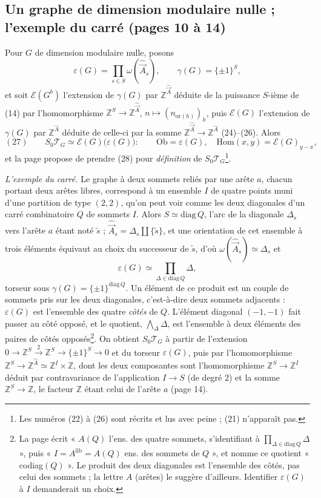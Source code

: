 \documentclass[11pt,a4paper]{article}
\begin{document}
\subsection*{Un graphe de dimension modulaire nulle ; l'exemple du carré
(pages 10 à 14)}

Pour $G$ de dimension modulaire nulle, posons
\[
\varepsilon(G) = \prod_{s \in S} \omega(\hat{\vec A}_s), \qquad
\gamma(G) = \{\pm 1\}^S,
\]
et soit $\mathcal{E}(G^b)$ l'extension de $\gamma(G)$ par $\mathbb{Z}^{\hat{\vec
A}}$ déduite de la puissance $S$-ième de (14) par l'homomorphisme
$\mathbb{Z}^S \to \mathbb{Z}^{\hat{\vec A}}$, $n \mapsto (n_{\mathrm{or}(h)})_h$,
puis $\mathcal{E}(G)$ l'extension de $\gamma(G)$ par $\mathbb{Z}^{\hat A}$
déduite de celle-ci par la somme $\mathbb{Z}^{\hat{\vec A}} \to
\mathbb{Z}^{\hat A}$ (24)--(26). Alors
\[
(27)\qquad S_0\mathcal{T}_G \simeq \mathcal{E}(G)\bigl(\varepsilon(G)\bigr) :
\qquad \mathrm{Ob} = \varepsilon(G), \quad \mathrm{Hom}(x,y) =
\mathcal{E}(G)_{y-x},
\]
et la page propose de prendre (28) pour \emph{définition} de
$S_0\mathcal{T}_G$\footnote{Les numéros (22) à (26) sont récrits et lus avec
peine ; (21) n'apparaît pas.}.

\emph{L'exemple du carré.} Le graphe à deux sommets reliés par une arête $a$,
chacun portant deux arêtes libres, correspond à un ensemble $I$ de quatre
points muni d'une partition de type $(2,2)$, qu'on peut voir comme les deux
diagonales d'un carré combinatoire $Q$ de sommets $I$. Alors $S \simeq
\mathrm{diag}\,Q$, l'arc de la diagonale $\Delta_s$ vers l'arête $a$ étant
noté $\tilde s$ ; $\hat{\vec A}_s = \Delta_s \amalg \{\tilde s\}$, et une
orientation de cet ensemble à trois éléments équivaut au choix du successeur
de $\tilde s$, d'où $\omega(\hat{\vec A}_s) \simeq \Delta_s$ et
\[
\varepsilon(G) \simeq \prod_{\Delta \in \mathrm{diag}\,Q} \Delta,
\]
torseur sous $\gamma(G) = \{\pm1\}^{\mathrm{diag}\,Q}$. Un élément de ce
produit est un couple de sommets pris sur les deux diagonales, c'est-à-dire
deux sommets adjacents : $\varepsilon(G)$ est l'ensemble des quatre
\emph{côtés} de $Q$. L'élément diagonal $(-1,-1)$ fait passer au côté opposé,
et le quotient, $\bigwedge_{\Delta} \Delta$, est l'ensemble à deux éléments des
paires de côtés opposés\footnote{La page écrit « $A(Q)$ l'ens. des quatre
sommets, s'identifiant à $\prod_{\Delta \in \mathrm{diag}\,Q} \Delta$ », puis
« $I = A^{\mathrm{lib}} = A(Q)$ ens. des sommets de $Q$ », et nomme ce quotient
« codiag$(Q)$ ». Le produit des deux diagonales est l'ensemble des côtés, pas
celui des sommets ; la lettre $A$ (arêtes) le suggère d'ailleurs. Identifier
$\varepsilon(G)$ à $I$ demanderait un choix.}. On obtient $S_0\mathcal{T}_G$ à
partir de l'extension $0 \to \mathbb{Z}^S \xrightarrow{2} \mathbb{Z}^S \to
\{\pm1\}^S \to 0$ et du torseur $\varepsilon(G)$, puis par l'homomorphisme
$\mathbb{Z}^S \to \mathbb{Z}^{\hat A} \simeq \mathbb{Z}^I \times \mathbb{Z}$,
dont les deux composantes sont l'homomorphisme $\mathbb{Z}^S \to \mathbb{Z}^I$
déduit par contravariance de l'application $I \to S$ (de degré $2$) et la somme
$\mathbb{Z}^S \to \mathbb{Z}$, le facteur $\mathbb{Z}$ étant celui de l'arête
$a$ (page 14).
\end{document}
